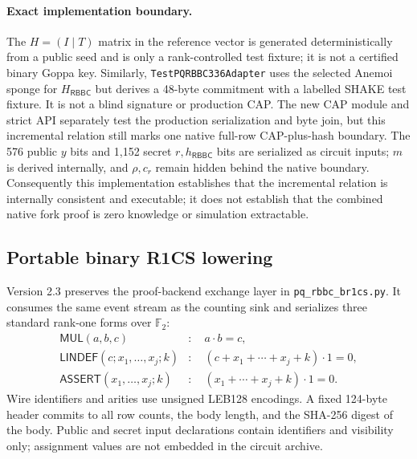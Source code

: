 \documentclass[11pt]{article}
\newcommand{\RBBC}{\mathsf{RBBC}}
\begin{document}
\paragraph{Exact implementation boundary.}
The $H=(I\mid T)$ matrix in the reference vector is generated deterministically
from a public seed and is only a rank-controlled test fixture; it is not a
certified binary Goppa key.  Similarly,
\texttt{TestPQRBBC336Adapter} uses the selected Anemoi sponge for
$H_{\RBBC}$ but derives a 48-byte commitment with a labelled SHAKE test
fixture.  It is not a blind signature or production CAP.  The new CAP module
and strict API separately test the production serialization and byte join, but
this incremental relation still marks one native full-row CAP-plus-hash
boundary.  The 576 public $y$ bits and
1,152 secret $r,h_{\RBBC}$ bits are serialized as circuit inputs; $m$ is derived internally,
and $\rho,c_r$ remain hidden behind the native boundary.  Consequently this implementation establishes that the incremental
relation is internally consistent and executable; it does not establish that
the combined native fork proof is zero knowledge or simulation
extractable.

\subsection{Portable binary R1CS lowering}\label{sec:br1cs}

Version 2.3 preserves the proof-backend exchange layer in
\texttt{pq\_rbbc\_br1cs.py}.  It consumes the same event stream as the counting
sink and serializes three standard rank-one forms over $\mathbb F_2$:
\begin{align*}
  \mathsf{MUL}(a,b,c)&:\quad a\cdot b=c,\\
  \mathsf{LINDEF}(c;x_1,\ldots,x_j;k)&:\quad
       (c+x_1+\cdots+x_j+k)\cdot 1=0,\\
  \mathsf{ASSERT}(x_1,\ldots,x_j;k)&:\quad
       (x_1+\cdots+x_j+k)\cdot 1=0.
\end{align*}
Wire identifiers and arities use unsigned LEB128 encodings.  A fixed 124-byte
header commits to all row counts, the body length, and the SHA-256 digest of the
body.  Public and secret input declarations contain identifiers and visibility
only; assignment values are not embedded in the circuit archive.
\end{document}
